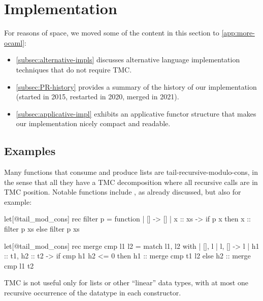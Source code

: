 \section{\OCaml Implementation}
\label{sec:implementation}

For reasons of space, we moved some of the content in this section to \cref{app:more-ocaml}:
\begin{itemize}
\item \cref{subsec:alternative-impls}
  discusses alternative language implementation techniques that do not require TMC.
\item \cref{subsec:PR-history} provides a summary of the history of our implementation (started in 2015, restarted in 2020, merged in 2021).
\item \cref{subsec:applicative-impl} exhibits an applicative functor structure that makes our implementation nicely compact and readable.
\end{itemize}

\subsection{Examples}

Many functions that consume and produce lists are
tail-recursive-modulo-cons, in the sense that all they have a TMC
decomposition where all recursive calls are in TMC position. Notable
functions include , as already discussed, but also for
example:

\begin{minipage}{0.47\linewidth}
\begin{Ocaml}
let[@tail_mod_cons] rec filter p =
  function
  | [] -> []
  | x :: xs ->
    if p x
    then x :: filter p xs
    else filter p xs
\end{Ocaml}
\end{minipage}
\hfill
\begin{minipage}{0.53\linewidth}
\begin{Ocaml}
let[@tail_mod_cons] rec merge cmp l1 l2 =
  match l1, l2 with
  | [], l | l, [] -> l
  | h1 :: t1, h2 :: t2 ->
      if cmp h1 h2 <= 0
      then h1 :: merge cmp t1 l2
      else h2 :: merge cmp l1 t2
\end{Ocaml}
\end{minipage}

TMC is not useful only for lists or other ``linear'' data types, with
at most one recursive occurrence of the datatype in each
constructor.

